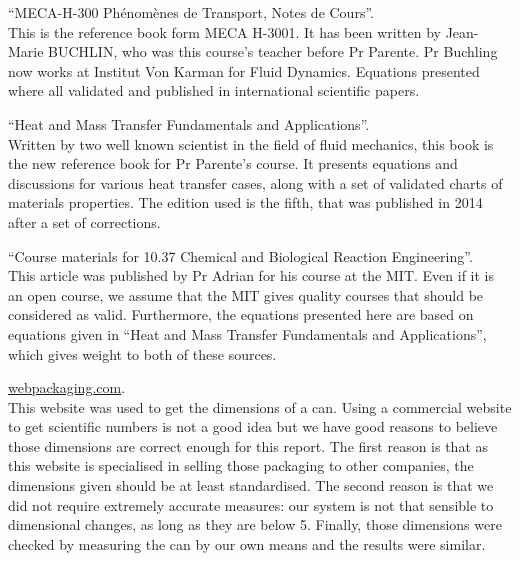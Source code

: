 \documentclass{report}
\begin{document}
	\vspace{11pt}
	
	``MECA-H-300 Phénomènes de Transport, Notes de Cours''\cite{Buchlin}.\\
	This is the reference book form MECA H-3001. It has been written by Jean-Marie BUCHLIN, who was this course's teacher before Pr Parente. Pr Buchling now works at Institut Von Karman for Fluid Dynamics. Equations presented where all validated and published in international scientific papers.
	
	\vspace{11pt}
	
	``Heat and Mass Transfer Fundamentals and Applications''\cite{HaMT}.\\
	Written by two well known scientist in the field of fluid mechanics, this book is the new reference book for Pr Parente's course. It presents equations and discussions for various heat transfer cases, along with a set of validated charts of materials properties. The edition used is the fifth, that was published in 2014 after a set of corrections.
	
	\vspace{11pt}
	
	``Course materials for 10.37 Chemical and Biological Reaction Engineering''\cite{MIT}.\\
	This article was published by Pr Adrian for his course at the MIT. Even if it is an open course, we assume that the MIT gives quality courses that should be considered as valid. Furthermore, the equations presented here are based on equations given in ``Heat and Mass Transfer Fundamentals and Applications''\cite{HaMT}, which gives weight to both of these sources.
	
	\vspace{11pt}
	
	\hyperref{http://www.webpackaging.com/en/portals/rexam/assets/11059498/spec-alu-202/}{}{}{webpackaging.com}.\\
	This website was used to get the dimensions of a can. Using a commercial website to get scientific numbers is not a good idea but we have good reasons to believe those dimensions are correct enough for this report. The first reason is that as this website is specialised in selling those packaging to other companies, the dimensions given should be at least standardised. The second reason is that we did not require extremely accurate measures: our system is not that sensible to dimensional changes, as long as they are below 5\textdiscount. Finally, those dimensions were checked by measuring the can by our own means and the results were similar.
	
\end{document}
